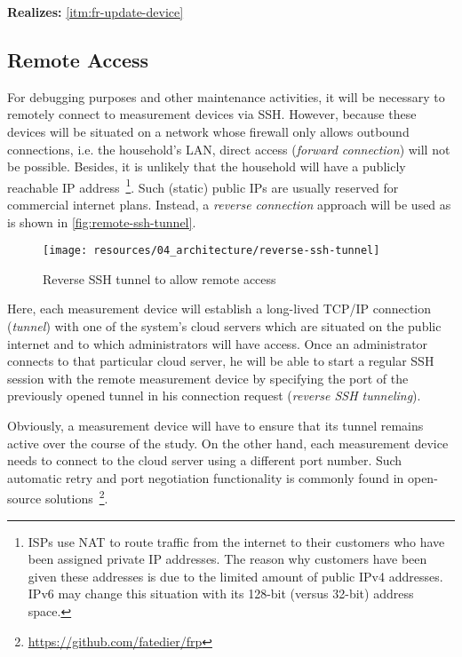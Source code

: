 \textbf{Realizes:} \ref{itm:fr-update-device}


\subsection{Remote Access}

For debugging purposes and other maintenance activities, it will be necessary to remotely connect to measurement devices via \acs{SSH}. However, because these devices will be situated on a network whose firewall only allows outbound connections, i.e. the household's \acs{LAN}, direct access (\textit{forward connection}) will not be possible. Besides, it is unlikely that the household will have a publicly reachable \acs{IP} address~\footnote{\acsp{ISP} use \acs{NAT} to route traffic from the internet to their customers who have been assigned private \acs{IP} addresses. The reason why customers have been given these addresses is due to the limited amount of public \acs{IP}v4 addresses. \acs{IP}v6 may change this situation with its 128-bit (versus 32-bit) address space.}. Such (static) public \acsp{IP} are usually reserved for commercial internet plans. Instead, a \textit{reverse connection} approach will be used as is shown in \autoref{fig:remote-ssh-tunnel}.

\begin{figure}[hbt]
  \centering
  \texttt{[image: resources/04\_architecture/reverse-ssh-tunnel]}
  \caption{Reverse \acs*{SSH} tunnel to allow remote access}
  \label{fig:remote-ssh-tunnel}
\end{figure}

\FloatBarrier

Here, each measurement device will establish a long-lived \acs{TCP}/\acs{IP} connection (\textit{tunnel}) with one of the system's cloud servers which are situated on the public internet and to which administrators will have access. Once an administrator connects to that particular cloud server, he will be able to start a regular \acs{SSH} session with the remote measurement device by specifying the port of the previously opened tunnel in his connection request (\textit{reverse \acs{SSH} tunneling}).

Obviously, a measurement device will have to ensure that its tunnel remains active over the course of the study. On the other hand, each measurement device needs to connect to the cloud server using a different port number. Such automatic retry and port negotiation functionality is commonly found in open-source solutions~\footnote{\url{https://github.com/fatedier/frp}}.

